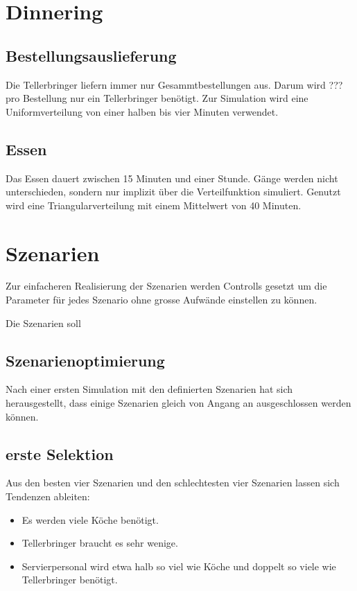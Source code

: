 \documentclass[ngerman,a4paper,12pt]{scrreprt}
\begin{document}
			
	\section{Dinnering}
		\subsection{Bestellungsauslieferung}					
			Die Tellerbringer liefern immer nur Gesammtbestellungen aus. Darum wird ??? pro Bestellung nur ein Tellerbringer benötigt. Zur Simulation wird eine Uniformverteilung von einer halben bis vier Minuten verwendet.


		\subsection{Essen}
			Das Essen dauert zwischen 15 Minuten und einer Stunde. Gänge werden nicht unterschieden, sondern nur implizit über die Verteilfunktion simuliert. Genutzt wird eine Triangularverteilung mit einem Mittelwert von 40 Minuten.\\
			
	\section{Szenarien}
		Zur einfacheren Realisierung der Szenarien werden Controlls gesetzt um die Parameter für jedes Szenario ohne grosse Aufwände einstellen zu können.\\
		
		
		Die Szenarien soll
			
		\subsection{Szenarienoptimierung}
		Nach einer ersten Simulation mit den definierten Szenarien hat sich herausgestellt, dass einige Szenarien gleich von Angang an ausgeschlossen werden können.
		
		\subsection{erste Selektion}
			Aus den besten vier Szenarien und den schlechtesten vier Szenarien lassen sich Tendenzen ableiten:
			\begin{itemize}
				\item Es werden viele Köche benötigt. 
				\item Tellerbringer braucht es sehr wenige.
				\item Servierpersonal wird etwa halb so viel wie Köche und doppelt so viele wie Tellerbringer benötigt.
			\end{itemize}
		
\end{document}
